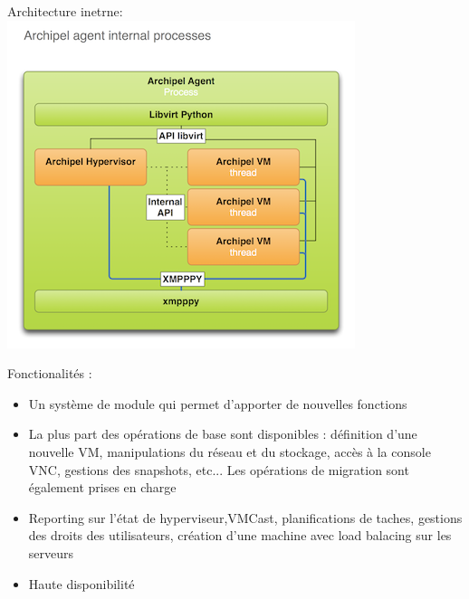 \documentclass{beamer}
\begin{document}
\begin{frame}
Architecture inetrne:\\
\includegraphics{images_presentation/intern.png}
\end{frame}

\begin{frame}
Fonctionalités : \\
\begin{itemize}
\item Un système de module qui permet d'apporter de nouvelles fonctions
\item La plus part des opérations de base sont disponibles : définition d'une nouvelle VM, manipulations du réseau et du stockage,
accès à la console VNC, gestions des snapshots, etc... 
Les opérations de migration sont également prises en charge
\item Reporting sur l'état de hyperviseur,VMCast, planifications de taches, gestions des droits des
utilisateurs, création d'une machine avec load balacing sur les serveurs
\item Haute disponibilité
\end{itemize}

\end{frame}
\end{document}
